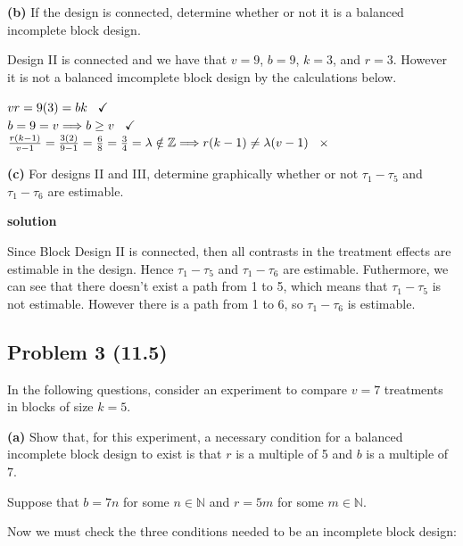 \documentclass[12pt,]{article}
\begin{document}
\textbf{(b)} If the design is connected, determine whether or not it is
a balanced incomplete block design.

Design II is connected and we have that \(v=9\), \(b=9\), \(k=3\), and
\(r=3\). However it is not a balanced imcomplete block design by the
calculations below.

\begin{center}
$vr = 9(3) = bk \hspace{.3cm}  \checkmark$\\
$b= 9 = v \Longrightarrow b \geq v \hspace{.3cm}  \checkmark$\\
$\frac{r(k-1)}{v-1} = \frac{3(2)}{9-1} = \frac{6}{8} = \frac{3}{4} = \lambda  \notin \mathbb{Z} \Longrightarrow r(k-1) \neq \lambda (v-1)  \hspace{.3cm} \times$
\end{center}

\textbf{(c)} For designs II and III, determine graphically whether or
not \(\tau_1 - \tau_5\) and \(\tau_1 - \tau_6\) are estimable.

\textbf{solution}

Since Block Design II is connected, then all contrasts in the treatment
effects are estimable in the design. Hence \(\tau_1 - \tau_5\) and
\(\tau_1 - \tau_6\) are estimable. Futhermore, we can see that there
doesn't exist a path from 1 to 5, which means that \(\tau_1 - \tau_5\)
is not estimable. However there is a path from 1 to 6, so
\(\tau_1 - \tau_6\) is estimable.

\subsection{Problem 3 (11.5)}\label{problem-3-11.5}

In the following questions, consider an experiment to compare \(v = 7\)
treatments in blocks of size \(k = 5\).

\textbf{(a)} Show that, for this experiment, a necessary condition for a
balanced incomplete block design to exist is that \(r\) is a multiple of
5 and \(b\) is a multiple of 7.

Suppose that \(b= 7n\) for some \(n \in \mathbb{N}\) and \(r= 5m\) for
some \(m \in \mathbb{N}\).

Now we must check the three conditions needed to be an incomplete block
design:
\end{document}
